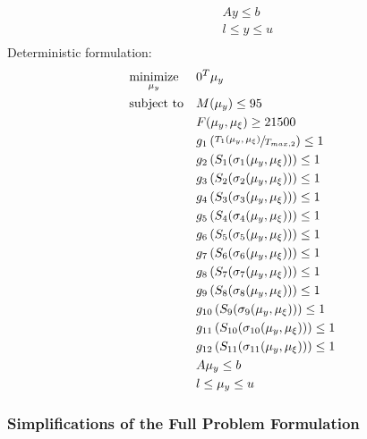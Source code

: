 \documentclass{article}
\begin{document}
\begin{multicols}{2}
\begin{equation}
\begin{aligned}
& & & Ay \leq b \\
& & & l \leq y \leq u \\
\end{aligned}
\end{equation}
\vfill \columnbreak
Deterministic formulation: 
\begin{equation}
\label{eq:specific_robust_equiv_deterministic_optim}
\begin{aligned}
& \underset{\mu_y}{\text{minimize}}
& & 0^T\mu_y \\
& \text{subject to}
& & M(\mu_y) \leq 95 \\
& & & F(\mu_y,\mu_{\xi}) \geq 21500 \\
& & & g_1 \left( \sfrac{T_1(\mu_y,\mu_{\xi})}{T_{max,2}} \right) \leq 1 \\
& & & g_2 \left( S_1 ( \sigma_1(\mu_y,\mu_{\xi}) ) \right) \leq 1 \\
& & & g_3 \left( S_2 ( \sigma_2(\mu_y,\mu_{\xi}) ) \right) \leq 1 \\
& & & g_4 \left( S_3 ( \sigma_3(\mu_y,\mu_{\xi}) ) \right) \leq 1 \\
& & & g_5 \left( S_4 ( \sigma_4(\mu_y,\mu_{\xi}) ) \right) \leq 1 \\
& & & g_6 \left( S_5 ( \sigma_5(\mu_y,\mu_{\xi}) ) \right) \leq 1 \\
& & & g_7 \left( S_6 ( \sigma_6(\mu_y,\mu_{\xi}) ) \right) \leq 1 \\
& & & g_8 \left( S_7 ( \sigma_7(\mu_y,\mu_{\xi}) ) \right) \leq 1 \\
& & & g_9 \left( S_8 ( \sigma_8(\mu_y,\mu_{\xi}) ) \right) \leq 1 \\
& & & g_{10} \left( S_9 ( \sigma_9(\mu_y,\mu_{\xi}) ) \right) \leq 1 \\
& & & g_{11} \left( S_{10} ( \sigma_{10}(\mu_y,\mu_{\xi}) ) \right) \leq 1 \\
& & & g_{12} \left( S_{11} ( \sigma_{11}(\mu_y,\mu_{\xi}) ) \right) \leq 1 \\
& & & A\mu_y \leq b \\
& & & l \leq \mu_y \leq u \\
\end{aligned}
\end{equation}
\end{multicols}

\subsubsection{Simplifications of the Full Problem Formulation}
\end{document}
